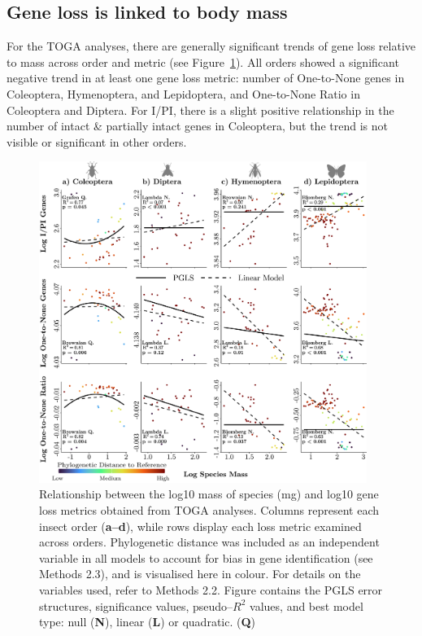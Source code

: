 \documentclass[11pt]{article}
\begin{document}
\subsection{Gene loss is linked to body mass}
For the TOGA analyses, there are generally significant trends of gene loss relative to mass across order and metric (see Figure~\ref{fig:toga-mass-figure}). All orders showed a significant negative trend in at least one gene loss metric: number of One-to-None genes in Coleoptera, Hymenoptera, and Lepidoptera, and One-to-None Ratio in Coleoptera and Diptera. For I/PI, there is a slight positive relationship in the number of intact \& partially intact genes in Coleoptera, but the trend is not visible or significant in other orders.


\begin{figure}[h]
    \centering
    \includegraphics[width=0.95\textwidth]{figures/TOGA_Output_Final_with_illustrations.pdf}
    \caption{Relationship between the log10 mass of species (mg) and log10 gene loss metrics obtained from TOGA analyses. Columns represent each insect order (\textbf{a--d}), while rows display each loss metric examined across orders. Phylogenetic distance was included as an independent variable in all models to account for bias in gene identification (see Methods 2.3), and is visualised here in colour. For details on the variables used, refer to Methods 2.2. Figure contains the PGLS error structures, significance values, pseudo--$R^2$ values, and best model type: null (\textbf{N}), linear (\textbf{L}) or quadratic. (\textbf{Q})} 
    \label{fig:toga-mass-figure}
\end{figure}
\pagebreak
\end{document}

